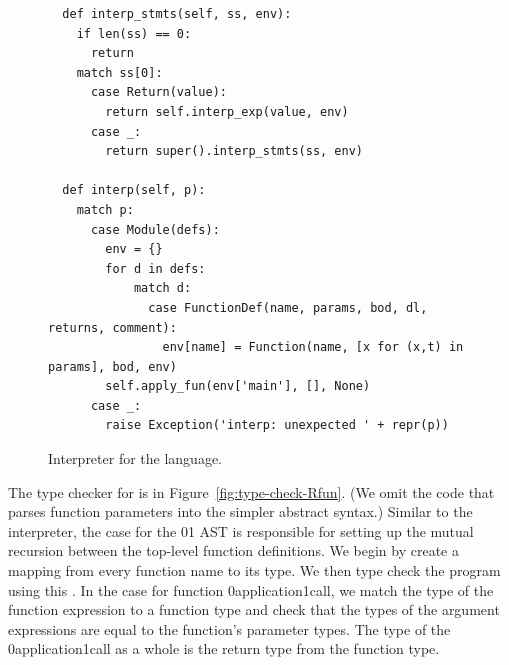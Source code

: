 \documentclass[7x10]{TimesAPriori_MIT}%
\def\racketEd{0}
\def\pythonEd{1}
\def\edition{1}
\newcommand{\racket}[1]{{\if\edition\racketEd{#1}\fi}}
\newcommand{\python}[1]{{\if\edition\pythonEd #1\fi}}
\begin{document}
\begin{figure}[tp]
{\begin{lstlisting}
  def interp_stmts(self, ss, env):
    if len(ss) == 0:
      return
    match ss[0]:
      case Return(value):
        return self.interp_exp(value, env)
      case _:
        return super().interp_stmts(ss, env)
    
  def interp(self, p):
    match p:
      case Module(defs):
        env = {}
        for d in defs:
            match d:
              case FunctionDef(name, params, bod, dl, returns, comment):
                env[name] = Function(name, [x for (x,t) in params], bod, env)
        self.apply_fun(env['main'], [], None)
      case _:
        raise Exception('interp: unexpected ' + repr(p))
\end{lstlisting}
\fi}
\caption{Interpreter for the \LangFun{} language.}
\label{fig:interp-Rfun}
\end{figure}



The type checker for \LangFun{} is in
Figure~\ref{fig:type-check-Rfun}.  (We omit the code that parses
function parameters into the simpler abstract syntax.)  Similar to the
interpreter, the case for the
\racket{}\python{}
%
AST is responsible for setting up the mutual recursion between the
top-level function definitions. We begin by create a mapping
 from every function name to its type. We then type check
the program using this .
%
In the case for function \racket{application}\python{call}, we match
the type of the function expression to a function type and check that
the types of the argument expressions are equal to the function's
parameter types. The type of the \racket{application}\python{call} as
a whole is the return type from the function type.
\end{document}
